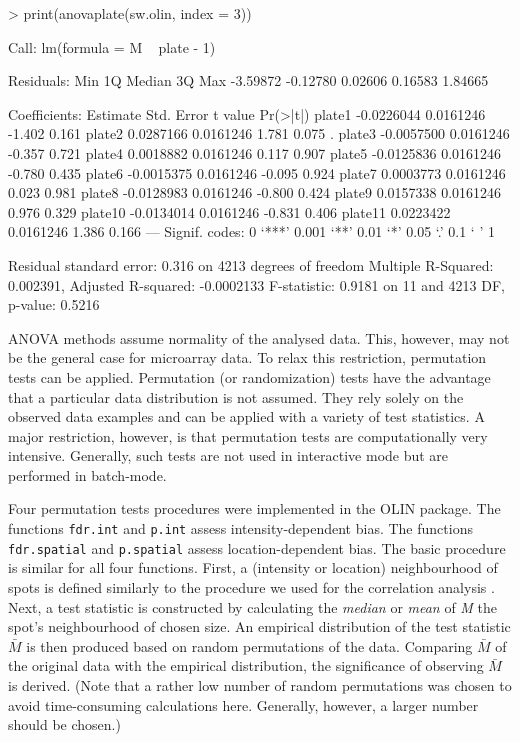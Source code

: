 \documentclass[a4paper,11pt]{article}
\begin{document}
\begin{Schunk}
\begin{Sinput}
> print(anovaplate(sw.olin, index = 3))
\end{Sinput}
\begin{Soutput}
Call:
lm(formula = M ~ plate - 1)

Residuals:
     Min       1Q   Median       3Q      Max 
-3.59872 -0.12780  0.02606  0.16583  1.84665 

Coefficients:
          Estimate Std. Error t value Pr(>|t|)  
plate1  -0.0226044  0.0161246  -1.402    0.161  
plate2   0.0287166  0.0161246   1.781    0.075 .
plate3  -0.0057500  0.0161246  -0.357    0.721  
plate4   0.0018882  0.0161246   0.117    0.907  
plate5  -0.0125836  0.0161246  -0.780    0.435  
plate6  -0.0015375  0.0161246  -0.095    0.924  
plate7   0.0003773  0.0161246   0.023    0.981  
plate8  -0.0128983  0.0161246  -0.800    0.424  
plate9   0.0157338  0.0161246   0.976    0.329  
plate10 -0.0134014  0.0161246  -0.831    0.406  
plate11  0.0223422  0.0161246   1.386    0.166  
---
Signif. codes:  0 `***' 0.001 `**' 0.01 `*' 0.05 `.' 0.1 ` ' 1 

Residual standard error: 0.316 on 4213 degrees of freedom
Multiple R-Squared: 0.002391,	Adjusted R-squared: -0.0002133 
F-statistic: 0.9181 on 11 and 4213 DF,  p-value: 0.5216 
\end{Soutput}
\end{Schunk}


ANOVA methods assume normality of the analysed data. This, however, may not be the
general case for microarray data. To relax this restriction, permutation tests can be
applied. Permutation (or randomization) tests have the advantage that a particular data 
distribution is not assumed. They rely solely on the observed data examples and can be 
applied with a variety of test statistics. A major restriction, however, is that 
permutation tests are computationally very intensive.
Generally, such tests are not used in interactive mode but are performed in batch-mode. 


Four permutation tests procedures were implemented in the OLIN package. 
The functions \texttt{fdr.int}  and \texttt{p.int} assess intensity-dependent
bias. The functions \texttt{fdr.spatial} and \texttt{p.spatial} assess location-dependent
bias. The basic procedure is similar for all four functions.
First, a (intensity or location)  neighbourhood of spots is defined similarly to the procedure
we used for the correlation analysis .  Next, a test statistic is constructed by calculating
 the \emph{median} or \emph{mean} of \emph{M} the  spot's  neighbourhood of chosen size.
 An empirical distribution of the test statistic $\bar{M}$ is 
then produced  based on random permutations of the
data. Comparing  $\bar{M}$ of the original data with the empirical distribution, the significance 
of observing  $\bar{M}$ is derived. (Note that a rather low number of random permutations was chosen
to avoid time-consuming calculations here. Generally, however, a larger number should be chosen.)  
\end{document}
